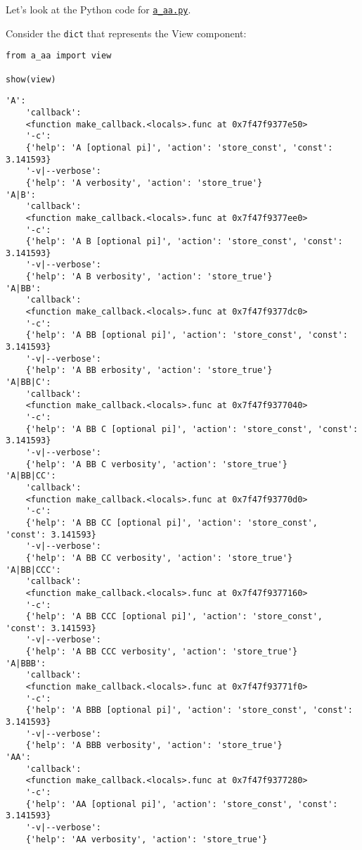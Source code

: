 \documentclass[10pt]{amsart}
\numberwithin{equation}{section}
\begin{document}
Let's look at the Python code for \href{https://github.com/tharte/parsearg/blob/master/parsearg/examples/a\_aa.py}{\texttt{a\_aa.py}}.

Consider the \texttt{dict} that represents the View component:
\begin{verbatim}
from a_aa import view

show(view)
\end{verbatim}

\begin{verbatim}
'A':
    'callback':
    <function make_callback.<locals>.func at 0x7f47f9377e50>
    '-c':
    {'help': 'A [optional pi]', 'action': 'store_const', 'const': 3.141593}
    '-v|--verbose':
    {'help': 'A verbosity', 'action': 'store_true'}
'A|B':
    'callback':
    <function make_callback.<locals>.func at 0x7f47f9377ee0>
    '-c':
    {'help': 'A B [optional pi]', 'action': 'store_const', 'const': 3.141593}
    '-v|--verbose':
    {'help': 'A B verbosity', 'action': 'store_true'}
'A|BB':
    'callback':
    <function make_callback.<locals>.func at 0x7f47f9377dc0>
    '-c':
    {'help': 'A BB [optional pi]', 'action': 'store_const', 'const': 3.141593}
    '-v|--verbose':
    {'help': 'A BB erbosity', 'action': 'store_true'}
'A|BB|C':
    'callback':
    <function make_callback.<locals>.func at 0x7f47f9377040>
    '-c':
    {'help': 'A BB C [optional pi]', 'action': 'store_const', 'const': 3.141593}
    '-v|--verbose':
    {'help': 'A BB C verbosity', 'action': 'store_true'}
'A|BB|CC':
    'callback':
    <function make_callback.<locals>.func at 0x7f47f93770d0>
    '-c':
    {'help': 'A BB CC [optional pi]', 'action': 'store_const', 'const': 3.141593}
    '-v|--verbose':
    {'help': 'A BB CC verbosity', 'action': 'store_true'}
'A|BB|CCC':
    'callback':
    <function make_callback.<locals>.func at 0x7f47f9377160>
    '-c':
    {'help': 'A BB CCC [optional pi]', 'action': 'store_const', 'const': 3.141593}
    '-v|--verbose':
    {'help': 'A BB CCC verbosity', 'action': 'store_true'}
'A|BBB':
    'callback':
    <function make_callback.<locals>.func at 0x7f47f93771f0>
    '-c':
    {'help': 'A BBB [optional pi]', 'action': 'store_const', 'const': 3.141593}
    '-v|--verbose':
    {'help': 'A BBB verbosity', 'action': 'store_true'}
'AA':
    'callback':
    <function make_callback.<locals>.func at 0x7f47f9377280>
    '-c':
    {'help': 'AA [optional pi]', 'action': 'store_const', 'const': 3.141593}
    '-v|--verbose':
    {'help': 'AA verbosity', 'action': 'store_true'}

\end{verbatim}
\end{document}
